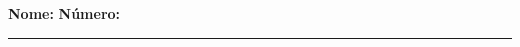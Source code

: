 {\sf
  \begin{center}
     \textbf{\bolsistas
     }
  \end{center}
}\bigskip


\vspace{2mm}
\setlength{\marginparwidth}{5cm}
\small \noindent \textbf{Nome:}\hspace{0.3cm}\hrulefill \hrulefill
\hrulefill \hspace{0.1cm} 
\textbf{Número:}\hspace{0.1cm}\rule{1cm}{.1mm}
